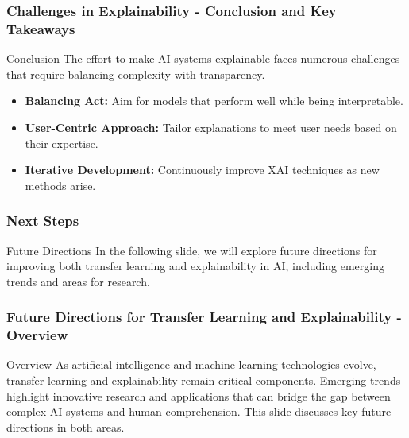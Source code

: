 \documentclass[aspectratio=169]{beamer}
\begin{document}
\begin{frame}[fragile]
    \frametitle{Challenges in Explainability - Conclusion and Key Takeaways}
    \begin{block}{Conclusion}
        The effort to make AI systems explainable faces numerous challenges that require balancing complexity with transparency.
    \end{block}
    
    \begin{itemize}
        \item \textbf{Balancing Act:} Aim for models that perform well while being interpretable.
        \item \textbf{User-Centric Approach:} Tailor explanations to meet user needs based on their expertise.
        \item \textbf{Iterative Development:} Continuously improve XAI techniques as new methods arise.
    \end{itemize}
\end{frame}

\begin{frame}[fragile]
    \frametitle{Next Steps}
    \begin{block}{Future Directions}
        In the following slide, we will explore future directions for improving both transfer learning and explainability in AI, including emerging trends and areas for research.
    \end{block}
\end{frame}

\begin{frame}[fragile]
    \frametitle{Future Directions for Transfer Learning and Explainability - Overview}
    \begin{block}{Overview}
        As artificial intelligence and machine learning technologies evolve, transfer learning and explainability remain critical components. 
        Emerging trends highlight innovative research and applications that can bridge the gap between complex AI systems and human comprehension. 
        This slide discusses key future directions in both areas.
    \end{block}
\end{frame}
\end{document}
